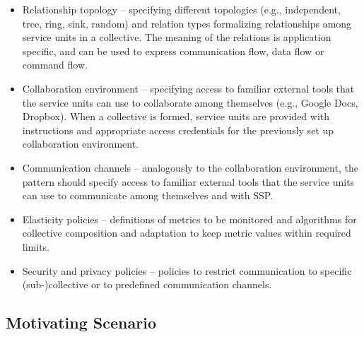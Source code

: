 \documentclass{llncs}
\begin{document}
          \begin{itemize}%
            \item Relationship topology -- specifying different topologies (e.g., independent, tree, ring, sink, random) and relation types formalizing relationships among service units in a collective. The meaning of the relations is application specific, and can be used to express communication flow, data flow or command flow. 
            
            \item Collaboration environment -- specifying access to familiar external tools that the service units can use to collaborate among themselves (e.g., Google Docs, Dropbox). When a collective is formed, service units are provided with instructions and appropriate access credentials for the previously set up collaboration environment. 
            
            \item Communication channels -- analogously to the collaboration environment, the pattern should specify access to familiar external tools that the service units can use to communicate among themselves and with SSP. 
            
            \item Elasticity policies -- definitions of metrics to be monitored and algorithms for collective composition and adaptation to keep metric values within required limits.

            \item Security and privacy policies -- policies to restrict communication to specific (sub-)collective or to predefined communication channels.
            
          \end{itemize}


    \subsection{Motivating Scenario}
    \label{sec:intro:scenario}
\end{document}
